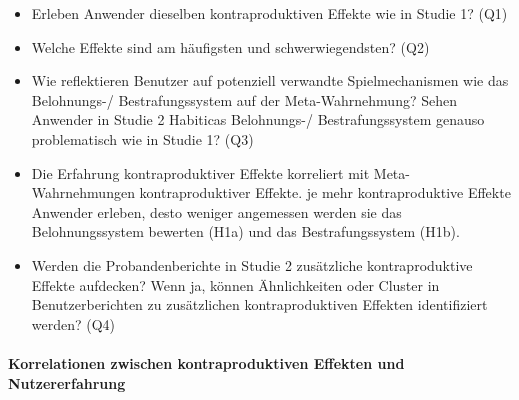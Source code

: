 \documentclass[sigconf, nonacm]{acmart}
\begin{document}
\begin{itemize}
    \item  Erleben Anwender dieselben kontraproduktiven Effekte wie in Studie 1? (Q1)
    \item Welche Effekte sind am häufigsten und schwerwiegendsten? (Q2)
    \item Wie reflektieren Benutzer auf potenziell verwandte Spielmechanismen wie das Belohnungs-/ Bestrafungssystem auf der Meta-Wahrnehmung? Sehen Anwender in Studie 2 Habiticas Belohnungs-/ Bestrafungssystem genauso problematisch wie in Studie 1? (Q3)


    \item  Die Erfahrung kontraproduktiver Effekte korreliert mit Meta-Wahrnehmungen kontraproduktiver Effekte. je mehr kontraproduktive Effekte Anwender erleben, desto weniger angemessen werden sie das Belohnungssystem bewerten (H1a) und das Bestrafungssystem (H1b).


    \item Werden die Probandenberichte in Studie 2 zusätzliche kontraproduktive Effekte aufdecken? Wenn ja, können Ähnlichkeiten oder Cluster in Benutzerberichten zu zusätzlichen kontraproduktiven Effekten identifiziert werden? (Q4)
\end{itemize}

\paragraph{Korrelationen zwischen kontraproduktiven Effekten und Nutzererfahrung}
\end{document}

